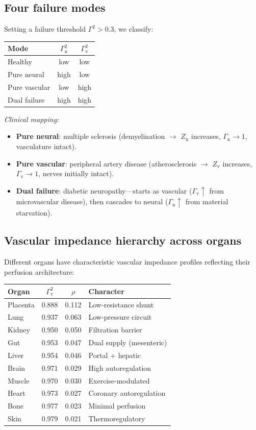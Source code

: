﻿\documentclass[aps,pre,twocolumn,superscriptaddress,floatfix]{revtex4-2}
\newcommand{\Gv}{\Gamma_{\mathrm{v}}}
\newcommand{\Gn}{\Gamma_{\mathrm{n}}}
\newcommand{\Zv}{Z_{\mathrm{v}}}
\newcommand{\Zn}{Z_{\mathrm{n}}}
\begin{document}
\subsection{Four failure modes}

Setting a failure threshold $\Gamma^2 > 0.3$, we classify:
\begin{center}
\begin{tabular}{lcc}
\hline
\textbf{Mode} & $\Gn^2$ & $\Gv^2$ \\
\hline
Healthy      & low  & low  \\
Pure neural  & high & low  \\
Pure vascular & low & high \\
Dual failure & high & high \\
\hline
\end{tabular}
\end{center}

\emph{Clinical mapping:}
\begin{itemize}
  \item \textbf{Pure neural}: multiple sclerosis (demyelination
    $\to$ $\Zn$ increases, $\Gn \to 1$, vasculature intact).
  \item \textbf{Pure vascular}: peripheral artery disease
    (atherosclerosis $\to$ $\Zv$ increases, $\Gv \to 1$,
    nerves initially intact).
  \item \textbf{Dual failure}: diabetic neuropathy---starts as
    vascular ($\Gv \uparrow$ from microvascular disease),
    then cascades to neural ($\Gn \uparrow$ from material
    starvation).
\end{itemize}


\subsection{Vascular impedance hierarchy across organs}

Different organs have characteristic vascular impedance
profiles reflecting their perfusion architecture:

\begin{center}
\begin{tabular}{lccl}
\hline
\textbf{Organ} & $\Gv^2$ & $\rho$ & \textbf{Character} \\
\hline
Placenta & 0.888 & 0.112 & Low-resistance shunt \\
Lung     & 0.937 & 0.063 & Low-pressure circuit \\
Kidney   & 0.950 & 0.050 & Filtration barrier \\
Gut      & 0.953 & 0.047 & Dual supply (mesenteric) \\
Liver    & 0.954 & 0.046 & Portal + hepatic \\
Brain    & 0.971 & 0.029 & High autoregulation \\
Muscle   & 0.970 & 0.030 & Exercise-modulated \\
Heart    & 0.973 & 0.027 & Coronary autoregulation \\
Bone     & 0.977 & 0.023 & Minimal perfusion \\
Skin     & 0.979 & 0.021 & Thermoregulatory \\
\hline
\end{tabular}
\end{center}
\end{document}
